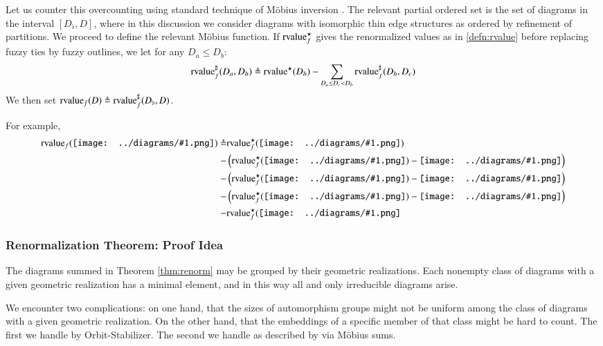 \documentclass{article}
\theoremstyle{plain}
\theoremstyle{definition}
\newcommand{\rvalue}{\text{\textnormal{rvalue}}}
\newcommand{\wrap}[1]{\left(#1\right)}
\newcommand{\sdia}[1]{\begin{gathered}\texttt{[image: ../diagrams/\#1.png]}\end{gathered}}
\begin{document}
            Let us counter this overcounting using standard technique of
            M\"obius inversion \citep{ro64}. The relevant partial ordered set
            is the set of diagrams in the interval $[D_\flat, D]$, where in
            this discussion we consider diagrams with isomorphic thin edge
            structures as ordered by refinement of partitions.  We proceed to
            define the relevant M\"obius function.  If $\rvalue^\star_f$ gives
            the renormalized values as in \ref{defn:rvalue} before replacing
            fuzzy ties by fuzzy outlines, we let for any $D_a \leq D_b$:
            $$
                \rvalue^\sharp_f(D_a, D_b)
                \triangleq
                \rvalue^\star(D_b) 
                - 
                \sum_{D_a \leq D_c < D_b}
                    \rvalue^\sharp_f(D_b, D_c) 
            $$
            We then set $\rvalue_f(D) \triangleq \rvalue^\sharp_f(D_\flat, D)$.

            For example, 
            \begin{align*}
                \rvalue_f(\sdia{(012-3)(01-12-23)})
                \triangleq
                    &\rvalue^\star_f(\sdia{(012-3)(01-12-23)}) \\
                -   &\wrap{\rvalue^\star_f(\sdia{(01-2-3)(01-12-23)}) - \sdia{(0-1-2-3)(01-12-23)}} \\
                -   &\wrap{\rvalue^\star_f(\sdia{(02-1-3)(01-12-23)}) - \sdia{(0-1-2-3)(01-12-23)}} \\
                -   &\wrap{\rvalue^\star_f(\sdia{(0-12-3)(01-12-23)}) - \sdia{(0-1-2-3)(01-12-23)}} \\
                -   &      \rvalue^\star_f(\sdia{(0-1-2-3)(01-12-23)}
            \end{align*}

        \subsubsection*{Renormalization Theorem: Proof Idea}
            The diagrams summed in Theorem \ref{thm:renorm} may be grouped by
            their geometric realizations.  Each nonempty class of diagrams with
            a given geometric realization has a minimal element, and in this
            way all and only irreducible diagrams arise. 

            We encounter two complications: on one hand, that the sizes of
            automorphism groups might not be uniform among the class of
            diagrams with a given geometric realization.  On the other hand,
            that the embeddings of a specific member of that class might be
            hard to count.  The first we handle by Orbit-Stabilizer.  The
            second we handle as described by \label{subsubsect:mobius} via
            M\"obius sums.
           
\end{document}
